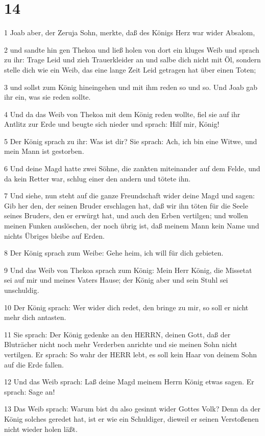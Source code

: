 \chapter{14}

\par 1 Joab aber, der Zeruja Sohn, merkte, daß des Königs Herz war wider Absalom,
\par 2 und sandte hin gen Thekoa und ließ holen von dort ein kluges Weib und sprach zu ihr: Trage Leid und zieh Trauerkleider an und salbe dich nicht mit Öl, sondern stelle dich wie ein Weib, das eine lange Zeit Leid getragen hat über einen Toten;
\par 3 und sollst zum König hineingehen und mit ihm reden so und so. Und Joab gab ihr ein, was sie reden sollte.
\par 4 Und da das Weib von Thekoa mit dem König reden wollte, fiel sie auf ihr Antlitz zur Erde und beugte sich nieder und sprach: Hilf mir, König!
\par 5 Der König sprach zu ihr: Was ist dir? Sie sprach: Ach, ich bin eine Witwe, und mein Mann ist gestorben.
\par 6 Und deine Magd hatte zwei Söhne, die zankten miteinander auf dem Felde, und da kein Retter war, schlug einer den andern und tötete ihn.
\par 7 Und siehe, nun steht auf die ganze Freundschaft wider deine Magd und sagen: Gib her den, der seinen Bruder erschlagen hat, daß wir ihn töten für die Seele seines Bruders, den er erwürgt hat, und auch den Erben vertilgen; und wollen meinen Funken auslöschen, der noch übrig ist, daß meinem Mann kein Name und nichts Übriges bleibe auf Erden.
\par 8 Der König sprach zum Weibe: Gehe heim, ich will für dich gebieten.
\par 9 Und das Weib von Thekoa sprach zum König: Mein Herr König, die Missetat sei auf mir und meines Vaters Hause; der König aber und sein Stuhl sei unschuldig.
\par 10 Der König sprach: Wer wider dich redet, den bringe zu mir, so soll er nicht mehr dich antasten.
\par 11 Sie sprach: Der König gedenke an den HERRN, deinen Gott, daß der Bluträcher nicht noch mehr Verderben anrichte und sie meinen Sohn nicht vertilgen. Er sprach: So wahr der HERR lebt, es soll kein Haar von deinem Sohn auf die Erde fallen.
\par 12 Und das Weib sprach: Laß deine Magd meinem Herrn König etwas sagen. Er sprach: Sage an!
\par 13 Das Weib sprach: Warum bist du also gesinnt wider Gottes Volk? Denn da der König solches geredet hat, ist er wie ein Schuldiger, dieweil er seinen Verstoßenen nicht wieder holen läßt.
